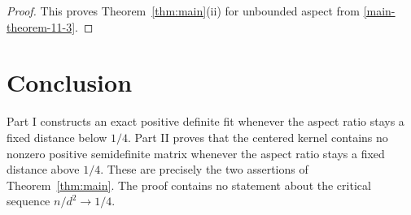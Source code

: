 \documentclass[11pt]{article}
\numberwithin{equation}{section}
\theoremstyle{definition}
\theoremstyle{remark}
\newcommand{\1}{\boldsymbol 1}
\begin{document}
\begin{aiblock}
\begin{proof}
  This proves Theorem~\ref{thm:main}(ii) for
  unbounded aspect from
  \cref{main-theorem-11-3}.
\end{proof}

\end{aiblock}

\section{Conclusion}\label{conclusion}

\begin{humanblock}


Part I constructs an exact positive definite fit whenever
the aspect ratio stays a fixed distance below $1/4$. Part
II proves that the centered kernel contains no nonzero
positive semidefinite matrix whenever the aspect ratio
stays a fixed distance above $1/4$. These are precisely the
two assertions of Theorem~\ref{thm:main}. The proof contains no
statement about the critical sequence $n/d^2\to1/4$.

\end{humanblock}




\end{document}
